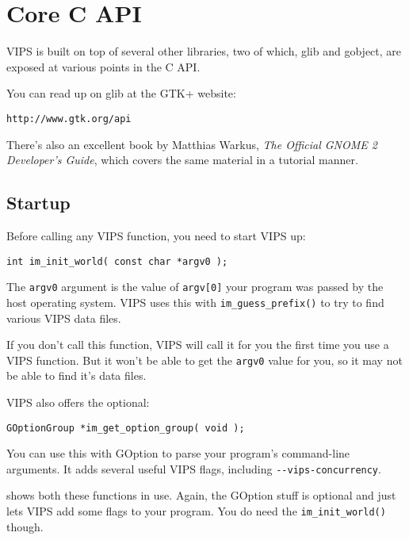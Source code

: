 \section{Core C API}

VIPS is
built on top of several other libraries, two of which, glib and gobject, are 
exposed at various points in the C API.

You can read up on glib at the GTK+ website:

\begin{verbatim}
http://www.gtk.org/api
\end{verbatim}

There's also an excellent book by Matthias Warkus, \emph{The Official 
GNOME 2 Developer's Guide}, which covers the same material in a tutorial
manner.

\subsection{Startup}

Before calling any VIPS function, you need to start VIPS up:

\begin{verbatim}
int im_init_world( const char *argv0 );
\end{verbatim}

The \verb+argv0+ argument is the value of \verb+argv[0]+ your program was passed
by the host operating system. VIPS uses this with \verb+im_guess_prefix()+
to try to find various VIPS data files.

If you don't call this function, VIPS will call it for you the first time you
use a VIPS function. But it won't be able to get the \verb+argv0+ value for
you, so it may not be able to find it's data files.

VIPS also offers the optional:

\begin{verbatim}
GOptionGroup *im_get_option_group( void );
\end{verbatim}

You can use this with GOption to parse your program's command-line arguments.
It adds several useful VIPS flags, including \verb+--vips-concurrency+.

 shows both these functions in use. Again, the GOption stuff is
optional and just lets VIPS add some flags to your program. You do need the
\verb+im_init_world()+ though.

